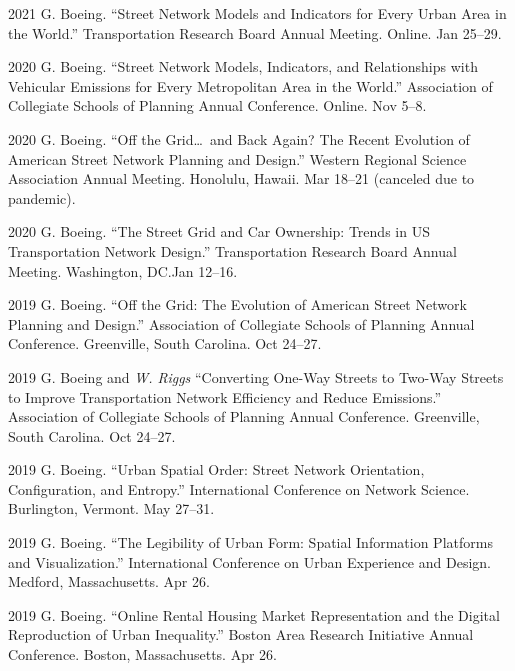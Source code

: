 \documentclass[11pt,letterpaper]{report}
\begin{document}
\begin{tablist}
        \item[2021] \tab{}G. Boeing. \enquote{Street Network Models and Indicators for Every Urban Area in the World.} Transportation Research Board Annual Meeting. Online. Jan 25--29.

        \item[2020] \tab{}G. Boeing. \enquote{Street Network Models, Indicators, and Relationships with Vehicular Emissions for Every Metropolitan Area in the World.} Association of Collegiate Schools of Planning Annual Conference. Online. Nov 5--8.

        \item[2020] \tab{}G. Boeing. \enquote{Off the Grid\ldots\ and Back Again? The Recent Evolution of American Street Network Planning and Design.} Western Regional Science Association Annual Meeting. Honolulu, Hawaii. Mar 18--21 (canceled due to pandemic).

        \item[2020] \tab{}G. Boeing. \enquote{The Street Grid and Car Ownership: Trends in US Transportation Network Design.} Transportation Research Board Annual Meeting. Washington, DC.\@ Jan 12--16.

        \item[2019] \tab{}G. Boeing. \enquote{Off the Grid: The Evolution of American Street Network Planning and Design.} Association of Collegiate Schools of Planning Annual Conference. Greenville, South Carolina. Oct 24--27.

        \item[2019] \tab{}G. Boeing and \textit{W. Riggs} \enquote{Converting One-Way Streets to Two-Way Streets to Improve Transportation Network Efficiency and Reduce Emissions.} Association of Collegiate Schools of Planning Annual Conference. Greenville, South Carolina. Oct 24--27.

        \item[2019] \tab{}G. Boeing. \enquote{Urban Spatial Order: Street Network Orientation, Configuration, and Entropy.} International Conference on Network Science. Burlington, Vermont. May 27--31.

        \item[2019] \tab{}G. Boeing. \enquote{The Legibility of Urban Form: Spatial Information Platforms and Visualization.} International Conference on Urban Experience and Design. Medford, Massachusetts. Apr 26.

        \item[2019] \tab{}G. Boeing. \enquote{Online Rental Housing Market Representation and the Digital Reproduction of Urban Inequality.} Boston Area Research Initiative Annual Conference. Boston, Massachusetts. Apr 26.


\end{tablist}
\end{document}
